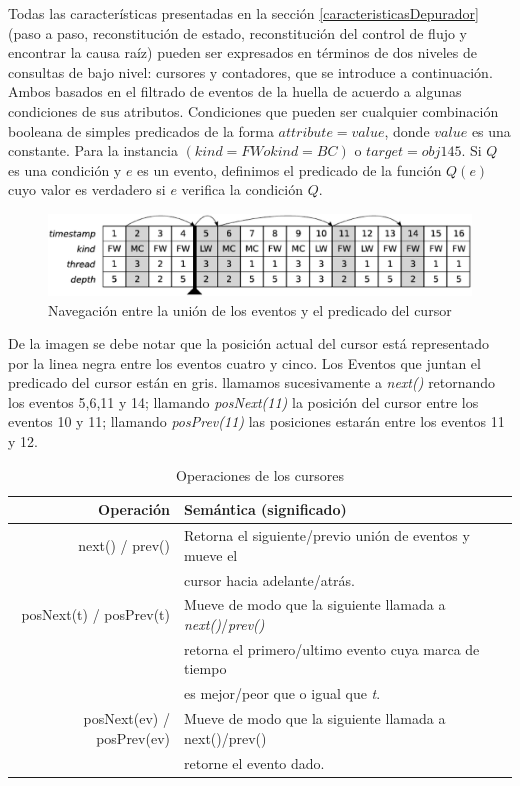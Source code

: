 \documentclass[12pt,legalpaper]{report}
\begin{document}
	Todas las características presentadas en la sección \ref{caracteristicasDepurador} (paso a paso, reconstitución de estado, reconstitución del control de flujo y encontrar la causa raíz) pueden ser expresados en términos de dos niveles de consultas de bajo nivel:  cursores y contadores, que se introduce a continuación.  Ambos basados en el filtrado de eventos de la huella de acuerdo a algunas condiciones de sus atributos.  Condiciones que pueden ser cualquier combinación booleana de simples predicados de la forma $attribute = value$, donde $value$ es una constante.  Para la instancia $(kind = FW o kind = BC)$ o $target = obj145$.  Si $Q$ es una condición y $e$ es un evento, definimos el predicado de la función $Q(e)$ cuyo valor es verdadero si $e$ verifica la condición $Q$.

\begin{figure}[hpb]
	\centering
	\includegraphics[scale=0.4]{images/TOD/CursorExample.eps}
	\caption{Navegación entre la unión de los eventos y el predicado del cursor}
	\label{cursorExample}
\end{figure}

De la imagen se debe notar que la posición actual del cursor está representado por la linea negra entre los eventos cuatro y cinco.  Los Eventos que juntan el predicado del cursor están en gris.   llamamos sucesivamente a \textit{next()} retornando los eventos 5,6,11 y 14;  llamando \textit{posNext(11)} la posición del cursor entre los eventos 10 y 11; llamando \textit{posPrev(11)} las posiciones estarán entre los eventos 11 y 12.

\begin{table}[!h]
\begin{center}
\begin{tabular}{| r | l |}
\hline
\rowcolor[gray]{0.9}Operación & Semántica (significado)\\
\hline
next() / prev() & Retorna el siguiente/previo unión de eventos y mueve el \\
                       & cursor hacia adelante/atrás.\\
\hline
posNext(t) / posPrev(t) & Mueve de modo que la siguiente llamada a \textit{next()}/\textit{prev()}\\
                                     & retorna el primero/ultimo evento cuya marca de tiempo \\
                                     & es mejor/peor que o igual que \textit{t}.\\
\hline
posNext(ev) / posPrev(ev) & Mueve de modo que la siguiente llamada a next()/prev()\\
                                           & retorne el evento dado.\\
\hline
\end{tabular}
\caption{Operaciones de los cursores}
\label{operacionesCursores}
\end{center}
\end{table}
\end{document}
